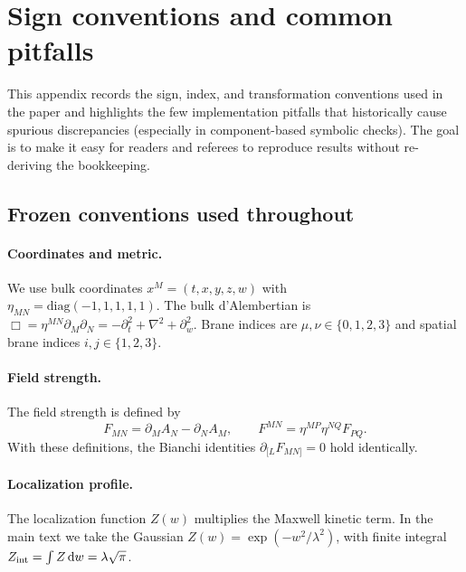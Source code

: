\documentclass[11pt]{article}
\newcommand{\dd}{\mathrm d}
\newcommand{\A}{A}
\newcommand{\F}{F}
\newcommand{\Z}{Z}
\newcommand{\lam}{\lambda}      %
\newcommand{\Zint}{Z_{\rm int}} %
\begin{document}
\section{Sign conventions and common pitfalls}
\label{app:conventions_pitfalls}

This appendix records the sign, index, and transformation conventions used in the
paper and highlights the few implementation pitfalls that historically cause
spurious discrepancies (especially in component-based symbolic checks). The goal
is to make it easy for readers and referees to reproduce results without
re-deriving the bookkeeping.

\subsection{Frozen conventions used throughout}

\paragraph{Coordinates and metric.}
We use bulk coordinates \(x^M=(t,x,y,z,w)\) with\\
\(\eta_{MN}=\mathrm{diag}(-1,1,1,1,1)\). The bulk d'Alembertian is
\(\Box=\eta^{MN}\partial_M\partial_N=-\partial_t^2+\nabla^2+\partial_w^2\).
Brane indices are \(\mu,\nu\in\{0,1,2,3\}\) and spatial brane indices
\(i,j\in\{1,2,3\}\).

\paragraph{Field strength.}
The field strength is defined by
\begin{equation}
  \F_{MN}=\partial_M\A_N-\partial_N\A_M,
  \qquad
  \F^{MN}=\eta^{MP}\eta^{NQ}\F_{PQ}.
\end{equation}
With these definitions, the Bianchi identities
\(\partial_{[L}\F_{MN]}=0\) hold identically.

\paragraph{Localization profile.}
The localization function \(\Z(w)\) multiplies the Maxwell kinetic term. In the
main text we take the Gaussian
\(\Z(w)=\exp(-w^2/\lam^2)\), with finite integral
\(\Zint=\int\Z\,\dd w=\lam\sqrt{\pi}\).
\end{document}
